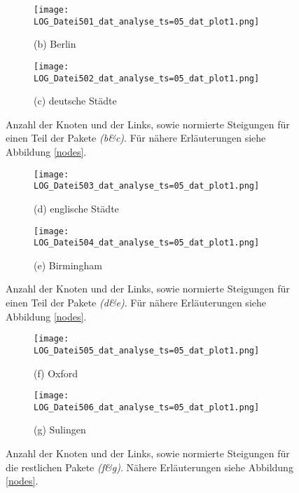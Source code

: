 \documentclass[fontsize=11pt, twoside, a4paper]{scrartcl}
\begin{document}
\begin{figure}
	\begin{minipage}[t]{0.75\textwidth}
		\begin{figure}[H]
		\texttt{[image: LOG\_Datei501\_dat\_analyse\_ts=05\_dat\_plot1.png]}
		\caption*{(b) Berlin}
		\end{figure}
	\end{minipage}
	\begin{minipage}[t]{0.75\textwidth}
		\begin{figure}[H]
		\texttt{[image: LOG\_Datei502\_dat\_analyse\_ts=05\_dat\_plot1.png]}
		\caption*{(c) deutsche Städte}
		\end{figure}
	\end{minipage}
\caption{Anzahl der Knoten und der Links, sowie normierte Steigungen für einen Teil der Pakete \textit{(b\&c)}. Für nähere Erläuterungen siehe Abbildung \ref{nodes}.}
\end{figure}

\begin{figure}
		\begin{minipage}[t]{0.75\textwidth}
		\begin{figure}[H]
		\texttt{[image: LOG\_Datei503\_dat\_analyse\_ts=05\_dat\_plot1.png]}
		\caption*{(d) englische Städte}
		\end{figure}
	\end{minipage}
	\begin{minipage}[t]{0.75\textwidth}
		\begin{figure}[H]
		\texttt{[image: LOG\_Datei504\_dat\_analyse\_ts=05\_dat\_plot1.png]}
		\caption*{(e) Birmingham}
		\end{figure}
	\end{minipage}
\caption*{Anzahl der Knoten und der Links, sowie normierte Steigungen für einen Teil der Pakete \textit{(d\&e)}. Für nähere Erläuterungen siehe Abbildung \ref{nodes}.}
\end{figure}

\begin{figure}	
		\begin{minipage}[t]{0.75\textwidth}
		\begin{figure}[H]
		\texttt{[image: LOG\_Datei505\_dat\_analyse\_ts=05\_dat\_plot1.png]}
		\caption*{(f) Oxford}
		\end{figure}
	\end{minipage}
	\begin{minipage}[t]{0.75\textwidth}
		\begin{figure}[H]
		\texttt{[image: LOG\_Datei506\_dat\_analyse\_ts=05\_dat\_plot1.png]}
		\caption*{(g) Sulingen}
		\end{figure}
	\end{minipage}
\caption{Anzahl der Knoten und der Links, sowie normierte Steigungen für die restlichen Pakete \textit{(f\&g)}. Nähere Erläuterungen siehe Abbildung \ref{nodes}.}
\end{figure}
\end{document}

